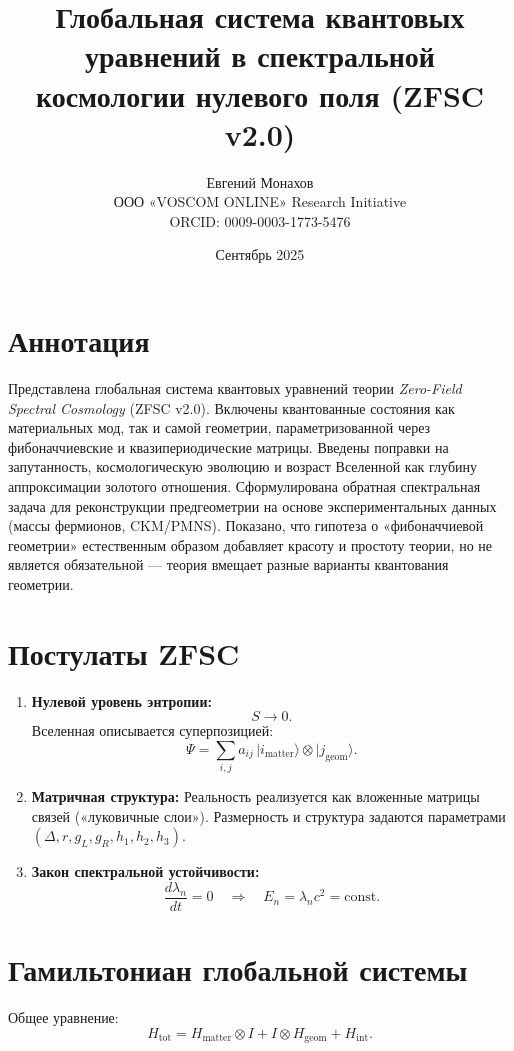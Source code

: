 \documentclass[12pt,a4paper]{article}
\title{Глобальная система квантовых уравнений в спектральной космологии нулевого поля (ZFSC v2.0)}
\author{Евгений Монахов \\ ООО «VOSCOM ONLINE» Research Initiative \\ ORCID: 0009-0003-1773-5476}
\date{Сентябрь 2025}
\begin{document}
\maketitle

\section*{Аннотация}
Представлена глобальная система квантовых уравнений теории \emph{Zero-Field Spectral Cosmology} (ZFSC v2.0). Включены квантованные состояния как материальных мод, так и самой геометрии, параметризованной через фибоначчиевские и квазипериодические матрицы. Введены поправки на запутанность, космологическую эволюцию и возраст Вселенной как глубину аппроксимации золотого отношения. Сформулирована обратная спектральная задача для реконструкции предгеометрии на основе экспериментальных данных (массы фермионов, CKM/PMNS). Показано, что гипотеза о «фибоначчиевой геометрии» естественным образом добавляет красоту и простоту теории, но не является обязательной — теория вмещает разные варианты квантования геометрии.

\section{Постулаты ZFSC}
\begin{enumerate}
    \item \textbf{Нулевой уровень энтропии:}
    \[
    S \to 0.
    \]
    Вселенная описывается суперпозицией:
    \[
    \Psi = \sum_{i,j} a_{ij}\, |i_{\text{matter}}\rangle \otimes |j_{\text{geom}}\rangle .
    \]

    \item \textbf{Матричная структура:}  
    Реальность реализуется как вложенные матрицы связей («луковичные слои»).  
    Размерность и структура задаются параметрами \((\Delta, r, g_L, g_R, h_1,h_2,h_3)\).

    \item \textbf{Закон спектральной устойчивости:}
    \[
    \frac{d \lambda_n}{dt} = 0 \quad \Rightarrow \quad E_n = \lambda_n c^2 = \text{const}.
    \]
\end{enumerate}

\section{Гамильтониан глобальной системы}
Общее уравнение:
\[
H_{\mathrm{tot}} = H_{\mathrm{matter}} \otimes I + I \otimes H_{\mathrm{geom}} + H_{\mathrm{int}}.
\]
\end{document}
